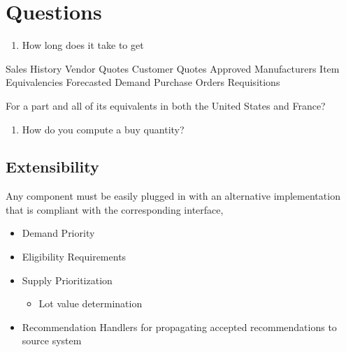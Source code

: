 \documentclass[letterpaper,10pt,english]{sphinxmanual}
\begin{document}
\chapter{Questions}
\label{\detokenize{BusinessProcessReengineering:questions}}\begin{enumerate}
%
\item {} 
How long does it take to get

\end{enumerate}

Sales History Vendor Quotes Customer Quotes Approved Manufacturers Item
Equivalencies Forecasted Demand Purchase Orders Requisitions

For a part and all of its equivalents in both the United States and
France?
\begin{enumerate}
%
\item {} 
How do you compute a buy quantity?

\end{enumerate}


\section{Extensibility}
\label{\detokenize{BusinessProcessReengineering:extensibility}}
Any component must be easily plugged in with an alternative
implementation that is compliant with the corresponding interface,
\begin{itemize}
\item {} 
Demand Priority

\item {} 
Eligibility Requirements

\item {} 
Supply Prioritization
\begin{itemize}
\item {} 
Lot value determination

\end{itemize}

\item {} 
Recommendation Handlers for propagating accepted recommendations to
source system

\end{itemize}
\end{document}

